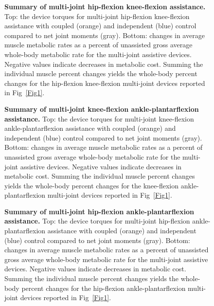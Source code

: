 \documentclass[10pt,letterpaper]{article}
\begin{document}
\begin{figure}[!h]
\begin{adjustwidth}{-1in}{0in} %
    \centering
    \caption{{\bf Summary of multi-joint hip-flexion knee-flexion assistance.}
        Top: the device torques for multi-joint hip-flexion knee-flexion assistance with coupled (orange) and independent (blue) control compared to net joint moments (gray). Bottom: changes in average muscle metabolic rates as a percent of unassisted gross average whole-body metabolic rate for the multi-joint assistive devices. Negative values indicate decreases in metabolic cost. Summing the individual muscle percent changes yields the whole-body percent changes for the hip-flexion knee-flexion multi-joint devices reported in Fig~\ref{Fig1}.}
\label{Fig3}
\end{adjustwidth}
\end{figure}

\begin{figure}[!h]
\begin{adjustwidth}{-1in}{0in} %
    \centering
    \caption{{\bf Summary of multi-joint knee-flexion ankle-plantarflexion assistance.}
        Top: the device torques for multi-joint knee-flexion ankle-plantarflexion assistance with coupled (orange) and independent (blue) control compared to net joint moments (gray). Bottom: changes in average muscle metabolic rates as a percent of unassisted gross average whole-body metabolic rate for the multi-joint assistive devices. Negative values indicate decreases in metabolic cost. Summing the individual muscle percent changes yields the whole-body percent changes for the knee-flexion ankle-plantarflexion multi-joint devices reported in Fig~\ref{Fig1}.}
\label{Fig4}
\end{adjustwidth}
\end{figure}

\begin{figure}[!h]
\begin{adjustwidth}{-1in}{0in} %
    \centering
    \caption{{\bf Summary of multi-joint hip-flexion ankle-plantarflexion assistance.}
        Top: the device torques for multi-joint hip-flexion ankle-plantarflexion assistance with coupled (orange) and independent (blue) control compared to net joint moments (gray). Bottom: changes in average muscle metabolic rates as a percent of unassisted gross average whole-body metabolic rate for the multi-joint assistive devices. Negative values indicate decreases in metabolic cost. Summing the individual muscle percent changes yields the whole-body percent changes for the hip-flexion ankle-plantarflexion multi-joint devices reported in Fig~\ref{Fig1}.}
\label{Fig5}
\end{adjustwidth}
\end{figure}    
\end{document}
